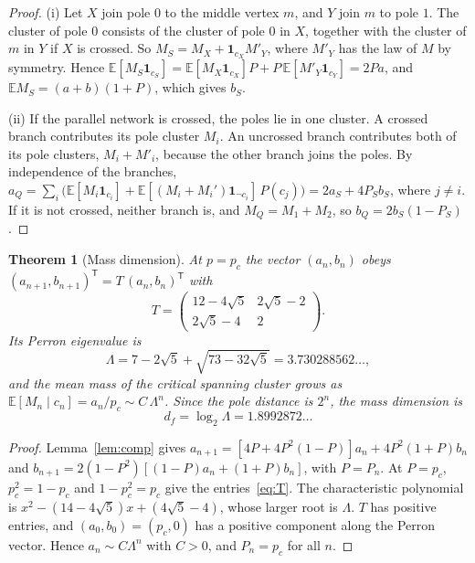 \documentclass[11pt]{article}
\newtheorem{theorem}{Theorem}
\theoremstyle{remark}\newtheorem*{remark}{Remark}
\newcommand{\EE}{\mathbb{E}}
\begin{document}
\begin{proof}
(i) Let $X$ join pole $0$ to the middle vertex $m$, and $Y$ join $m$ to pole $1$. The cluster of pole $0$ consists of the
cluster of pole $0$ in $X$, together with the cluster of $m$ in $Y$ if $X$ is crossed. So $M_S=M_X+\mathbf 1_{c_X}M'_Y$, where $M'_Y$
has the law of $M$ by symmetry. Hence $\EE[M_S\mathbf 1_{c_S}]=\EE[M_X\mathbf 1_{c_X}]P+P\,\EE[M'_Y\mathbf 1_{c_Y}]=2Pa$, and
$\EE M_S=(a+b)(1+P)$, which gives $b_S$.

(ii) If the parallel network is crossed, the poles lie in one cluster. A crossed branch contributes its pole cluster
$M_i$. An uncrossed branch contributes both of its pole clusters, $M_i+M'_i$, because the other branch joins the poles.
By independence of the branches,
$a_Q=\sum_i\bigl(\EE[M_i\mathbf 1_{c_i}]+\EE[(M_i+M_i')\mathbf 1_{\neg c_i}]\,P(c_j)\bigr)=2a_S+4P_Sb_S$, where $j\neq i$. If it is not crossed,
neither branch is, and $M_Q=M_1+M_2$, so $b_Q=2b_S(1-P_S)$.
\end{proof}

\begin{theorem}[Mass dimension]
\label{thm:mass}
At $p=p_c$ the vector $(a_n,b_n)$ obeys $(a_{n+1},b_{n+1})^{\mathsf T}=T\,(a_n,b_n)^{\mathsf T}$ with
\begin{equation}
T=\begin{pmatrix}12-4\sqrt5 & 2\sqrt5-2\\ 2\sqrt5-4 & 2\end{pmatrix}.
\label{eq:T}
\end{equation}
Its Perron eigenvalue is
\begin{equation}
\Lambda=7-2\sqrt5+\sqrt{73-32\sqrt5}=3.730288562\ldots,
\end{equation}
and the mean mass of the critical spanning cluster grows as $\EE[M_n\mid c_n]=a_n/p_c\sim C\,\Lambda^n$. Since the
pole distance is $2^n$, the mass dimension is
\begin{equation}
d_f=\log_2\Lambda=1.8992872\ldots
\end{equation}
\end{theorem}

\begin{proof}
Lemma~\ref{lem:comp} gives
$a_{n+1}=[4P+4P^2(1-P)]a_n+4P^2(1+P)b_n$ and $b_{n+1}=2(1-P^2)[(1-P)a_n+(1+P)b_n]$, with $P=P_n$. At $P=p_c$,
$p_c^2=1-p_c$ and $1-p_c^2=p_c$ give the entries~\eqref{eq:T}. The characteristic polynomial is
$x^2-(14-4\sqrt5)x+(4\sqrt5-4)$, whose larger root is $\Lambda$. $T$ has positive entries, and $(a_0,b_0)=(p_c,0)$ has a positive
component along the Perron vector. Hence $a_n\sim C\Lambda^n$ with $C>0$, and $P_n=p_c$ for all $n$.
\end{proof}
\end{document}
